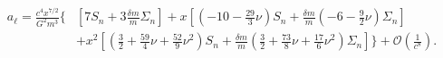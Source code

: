 \begin{align}
\label{alCO}
a_\ell=\frac{c^4 x^{7/2}}{G^2 m^3}\Bigg\{&
\left[7S_n+3\frac{\delta m}{m}\Sigma _n\right]
+x \left[\left(-10 -\frac{29}{3} \nu\right)S_n+\frac{\delta m}{m}\left(-6 -\frac{9}{2} \nu\right)\Sigma _n\right]\nonumber\\
& +x^2 \left[\left(\frac{3}{2} + \frac{59}{4} \nu + \frac{52}{9} \nu^2\right)S_n+\frac{\delta m}{m}\left(\frac{3}{2} + \frac{73}{8} \nu + \frac{17}{6} \nu^2\right)\Sigma _n\right]\Bigg\}+\mathcal{O}\left(\frac{1}{c^8}\right).
\end{align}